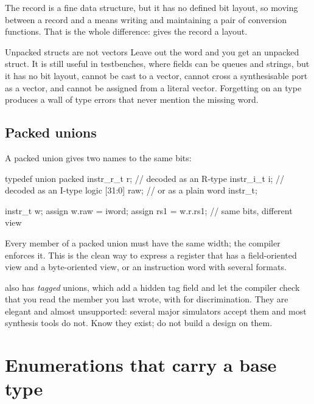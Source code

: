 The \VHDL{} record is a fine data structure, but it has no defined bit layout,
so moving between a record and a  means writing and
maintaining a pair of conversion functions. That is the whole difference:
 gives the record a layout.

\begin{gotcha}{Unpacked structs are not vectors}
Leave out the word  and you get an unpacked struct. It is still
useful in testbenches, where fields can be queues and strings, but it has
no bit layout, cannot be cast to a vector, cannot cross a synthesisable port
as a vector, and cannot be assigned from a literal vector. Forgetting
 on an \RTL{} type produces a wall of type errors that never
mention the missing word.
\end{gotcha}

\subsection{Packed unions}

A packed union gives two names to the same bits:

\begin{svcode}
typedef union packed {
  instr_r_t     r;              // decoded as an R-type
  instr_i_t     i;              // decoded as an I-type
  logic [31:0]  raw;            // or as a plain word
} instr_t;

instr_t w;
assign w.raw = iword;
assign rs1   = w.r.rs1;         // same bits, different view
\end{svcode}

Every member of a packed union must have the same width; the compiler
enforces it. This is the clean way to express a register that has a
field-oriented view and a byte-oriented view, or an instruction word with
several formats.

\SV{} also has \emph{tagged} unions, which add a hidden tag field and let the
compiler check that you read the member you last wrote, with
 for discrimination. They are elegant and almost
unsupported: several major simulators accept them and most synthesis tools do
not. Know they exist; do not build a design on them.

\section{Enumerations that carry a base type}
\label{sec:beyond:enum}

